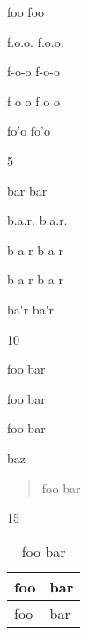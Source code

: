 
\def\mytitle{Abbreviations}















\gls{foo} \gls{foo}

\gls{f.o.o.} \gls{f.o.o.}

f-o-o f-o-o

\gls{f o o} \gls{f o o}

fo'o fo'o

5

\gls{bar} \gls{bar}

\gls{b.a.r.} \gls{b.a.r.}

\gls{b-a-r} \gls{b-a-r}

\gls{b a r} \gls{b a r}

\gls{ba'r} \gls{ba'r}

10

\gls{foo bar}

\gls{foo}
\gls{bar}

\gls{foo} \gls{bar}

\gls{baz}

\begin{quote}
\gls{foo bar}
\end{quote}

15

\begin{table}[htbp]
\begin{minipage}{\linewidth}
\setlength{\tymax}{0.5\linewidth}
\centering
\small
\caption{\gls{foo bar}}
\label{foobar}
\begin{tabulary}{\textwidth}{@{}ll@{}} \toprule
 \gls{foo} & \gls{bar} \\
\midrule

 \gls{foo} & \gls{bar} \\
\bottomrule

\end{tabulary}
\end{minipage}
\end{table}

